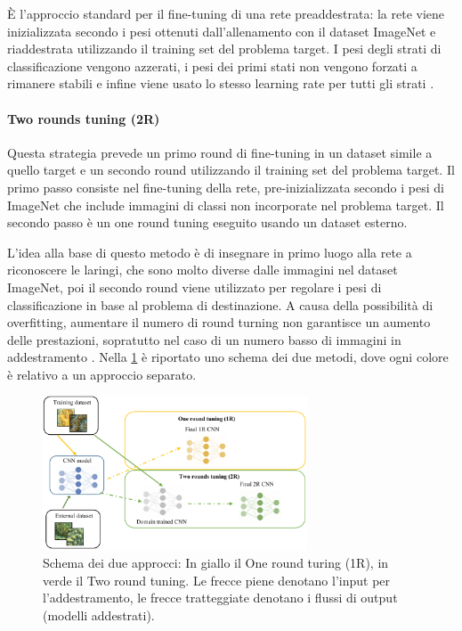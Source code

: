 È l'approccio standard per il fine-tuning di una rete preaddestrata: la rete viene inizializzata secondo i pesi ottenuti dall'allenamento con il dataset ImageNet e riaddestrata utilizzando il training set del problema target. I pesi degli strati di classificazione vengono azzerati, i pesi dei primi stati non vengono forzati a rimanere stabili e infine viene usato lo stesso learning rate per tutti gli strati \cite{lumini_plankton}. 

\paragraph{Two rounds tuning (2R)} \label{two-round-tuning}

Questa strategia prevede un primo round di fine-tuning in un dataset simile a quello target e un secondo round utilizzando il training set del problema target. Il primo passo consiste nel fine-tuning della rete, pre-inizializzata secondo i pesi di ImageNet che include immagini di classi non incorporate nel problema target. Il secondo passo è un one round tuning eseguito usando un  dataset esterno. 

L'idea alla base di questo metodo è di insegnare in primo luogo alla rete a riconoscere le laringi, che sono molto diverse dalle immagini nel dataset ImageNet, poi il secondo round viene utilizzato per regolare i pesi di classificazione in base al problema di destinazione. A causa della possibilità di \gls{overfitting}, aumentare il numero di round turning non garantisce un aumento delle prestazioni, sopratutto nel caso di un numero basso di immagini in addestramento \cite{lumini_plankton}. Nella \cref{fig:tl_2rt}  è riportato uno schema dei due metodi, dove ogni colore è relativo a un approccio separato. 

\begin{figure}[ht]
    \centering
    \includegraphics[width=0.7\textwidth]{transfer-learning/tl_2rt.pdf}
    \caption[Schema dei due approcci: In giallo il One round turing (1R), in verde il Two round tuning]{Schema dei due approcci: In giallo il One round turing (1R), in verde il Two round tuning. Le frecce piene denotano l'input per l'addestramento, le frecce tratteggiate denotano i flussi di output (modelli addestrati).}
    \label{fig:tl_2rt}
\end{figure}

